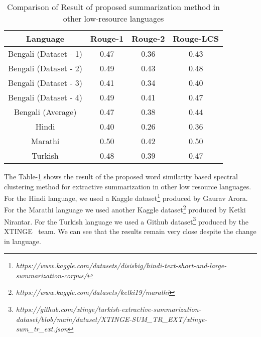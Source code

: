 \begin{table}
    \centering
    \begin{tabular}{cccc}\hline
        Language                & Rouge-1   & Rouge-2   & Rouge-LCS \\\hline
        Bengali (Dataset - 1)   & 0.47      & 0.36      & 0.43      \\
        Bengali (Dataset - 2)   & 0.49      & 0.43      & 0.48      \\
        Bengali (Dataset - 3)   & 0.41      & 0.34      & 0.40      \\
        Bengali (Dataset - 4)   & 0.49      & 0.41      & 0.47      \\
        Bengali (Average)       & 0.47      & 0.38      & 0.44      \\\hline
        Hindi                   & 0.40      & 0.26      & 0.36      \\\hline
        Marathi                 & 0.50	    & 0.42      & 0.50      \\\hline
        Turkish                 & 0.48      & 0.39      & 0.47      \\\hline
    \end{tabular}
    \caption{Comparison of Result of proposed summarization method in other low-resource languages}
    \label{tab:other_language}
\end{table}

The Table-\ref{tab:other_language} shows the result of the proposed word similarity based spectral clustering
method for extractive summarization in other low resource languages.
For the Hindi language, we used a Kaggle
dataset\footnote{\textit{https://www.kaggle.com/datasets/disisbig/hindi-text-short-and-large-summarization-corpus/}}
produced by Gaurav Arora.
For the Marathi language we used another Kaggle
dataset\footnote{\textit{https://www.kaggle.com/datasets/ketki19/marathi}} produced by Ketki Nirantar.
For the Turkish language we used a Github
dataset\footnote{\textit{https://github.com/xtinge/turkish-extractive-summarization-dataset/blob/main/dataset/XTINGE-SUM\_TR\_EXT/xtinge-sum\_tr\_ext.json}}
produced by the XTINGE~\cite{Demir-2024-xtinge_turkish_extractive} team.
We can see that the results remain very close despite the change in language.


